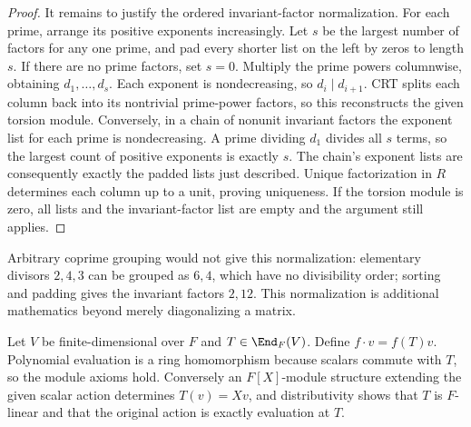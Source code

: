 \begin{proof}
It remains to justify the ordered invariant-factor normalization.
For each prime, arrange its positive exponents increasingly. Let $s$
be the largest number of factors for any one prime, and pad every
shorter list on the left by zeros to length $s$.
If there are no prime factors, set $s=0$.
Multiply the prime powers columnwise, obtaining $d_1,\ldots,d_s$.
Each exponent is nondecreasing, so $d_i\mid d_{i+1}$.
CRT splits each column back into its nontrivial prime-power factors,
so this reconstructs the given torsion module.
Conversely, in a chain of nonunit invariant factors the exponent list
for each prime is nondecreasing. A prime dividing $d_1$ divides all
$s$ terms, so the largest count of positive exponents is exactly $s$.
The chain's exponent lists are consequently exactly the padded lists
just described. Unique factorization in $R$ determines each column
up to a unit, proving uniqueness.
If the torsion module is zero, all lists and the invariant-factor list
are empty and the argument still applies.
\end{proof}
Arbitrary coprime grouping would not give this normalization:
elementary divisors $2,4,3$ can be grouped as $6,4$, which have no
divisibility order; sorting and padding gives the invariant factors
$2,12$. This normalization is additional mathematics beyond merely
diagonalizing a matrix.

Let $V$ be finite-dimensional over $F$ and $T\in\End_F(V)$.
Define $f\cdot v=f(T)v$. Polynomial evaluation is a ring homomorphism
because scalars commute with $T$, so the module axioms hold. Conversely
an $F[X]$-module structure extending the given scalar action determines
$T(v)=Xv$, and distributivity shows that $T$ is $F$-linear and that
the original action is exactly evaluation at $T$.

